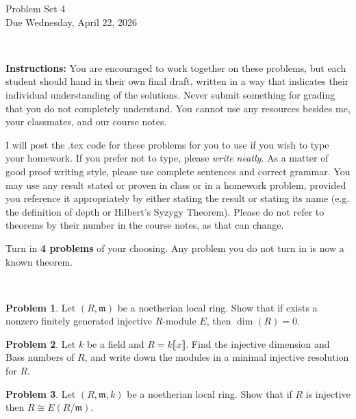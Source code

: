 \documentclass[11pt]{article}
\title{}
\date{\vspace{-0.5in}}
\newcommand{\m}{\mathfrak{m}}
\theoremstyle{definition}
\newtheorem{problem}{Problem}
\begin{document}
\thispagestyle{fancy}
\pagestyle{fancy}

\vspace{3em}

\begin{center}
	{\LARGE Problem Set 4 \\}
	Due Wednesday, April 22, 2026
\end{center}

\

\noindent
{\bf Instructions:}
You are encouraged to work together on these problems, but each student should hand in their own final draft, written in a way that indicates their individual understanding of the solutions. Never submit something for grading that you do not completely understand. You cannot use any resources besides me, your classmates, and our course notes.


I will post the .tex code for these problems for you to use if you wish to type your homework. If you prefer not to type, please {\em write neatly}. As a matter of good proof writing style, please use complete sentences and correct grammar. You may use any result  stated or proven in class or in a homework problem, provided you reference it appropriately by either stating the result or stating its name (e.g. the definition of depth or Hilbert's Syzygy Theorem). Please do not refer to theorems by their number in the course notes, as that can change.


\vspace{2em}


\noindent
Turn in {\bf 4 problems} of your choosing. Any problem you do not turn in is now a known theorem.

\



\begin{problem}
Let $(R, \m)$ be a noetherian local ring. Show that if exists a nonzero finitely generated injective $R$-module $E$, then $\dim(R) = 0$. 
\end{problem}

\vfill


\begin{problem}
	Let $k$ be a field and $R = k \llbracket x \rrbracket$. Find the injective dimension and Bass numbers of $R$, and write down the modules in a minimal injective resolution for $R$.
\end{problem}

\vfill


\begin{problem}
	Let $(R, \m, k)$ be a noetherian local ring. Show that if $R$ is injective then $R \cong E(R/\m)$.
\end{problem}
\end{document}

